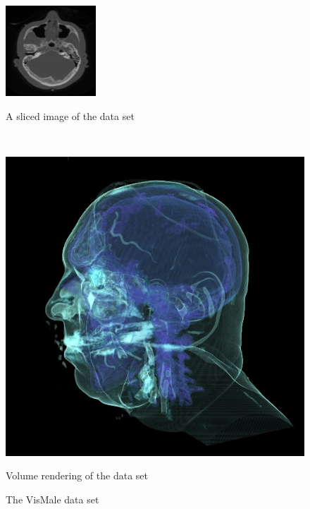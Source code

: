 \begin{figure}
\centering
\begin{minipage}{.3\textwidth}
\includegraphics[width=1\linewidth]{images/VisMale_slice.jpg}
\caption{A sliced image of the data set}
\label{fig:VisMale_slice}
\end{minipage}~
\begin{minipage}{.3\textwidth}
\includegraphics[width=1\linewidth]{images/VisMale.jpg}
\caption{Volume rendering of the data set}
\label{fig:VisMale}
\end{minipage}
\caption{The VisMale data set \cite{website:Roettger_volume_2013}}
\label{fig:multiple_VisMale}
\end{figure}

